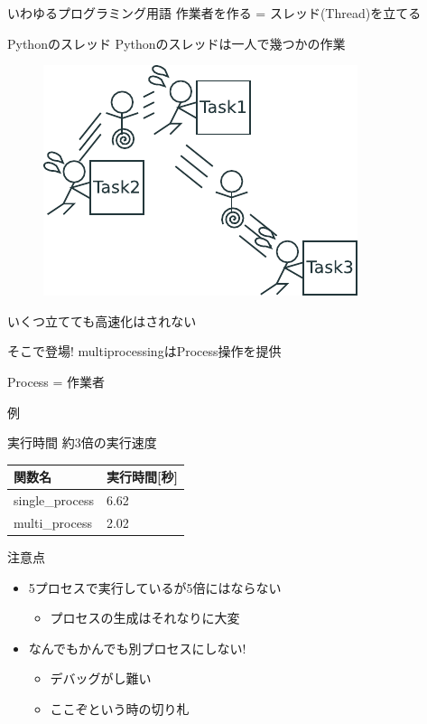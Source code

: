 \documentclass[12pt, xetex, xcolor=pdftex, dvipsnames]{beamer}
\begin{document}
\begin{frame}{いわゆるプログラミング用語}
    作業者を作る = スレッド(Thread)を立てる
\end{frame}
\begin{frame}{Pythonのスレッド}
    Pythonのスレッドは一人で幾つかの作業

    \begin{figure}
        \centering
        \includegraphics{img/python_thread.pdf}
    \end{figure}

    \pause
    いくつ立てても高速化はされない
\end{frame}
\begin{frame}{そこで登場!}
    multiprocessingはProcess操作を提供

    Process = 作業者
\end{frame}
\begin{frame}[fragile]{例}
    
\end{frame}
\begin{frame}{実行時間}
    約3倍の実行速度

    \begin{table}[b]
        \begin{tabular}{ll}\hline
            関数名 & 実行時間[秒] \\\hline
            single\_process & 6.62 \\\hline
            multi\_process & 2.02 \\\hline
        \end{tabular}
    \end{table}
\end{frame}
\begin{frame}{注意点}
    \begin{itemize}
        \item 5プロセスで実行しているが5倍にはならない
        \begin{itemize}
            \item プロセスの生成はそれなりに大変
        \end{itemize}
        \item なんでもかんでも別プロセスにしない!
        \begin{itemize}
            \item デバッグがし難い
            \item ここぞという時の切り札
        \end{itemize}
    \end{itemize}
\end{frame}
\end{document}
